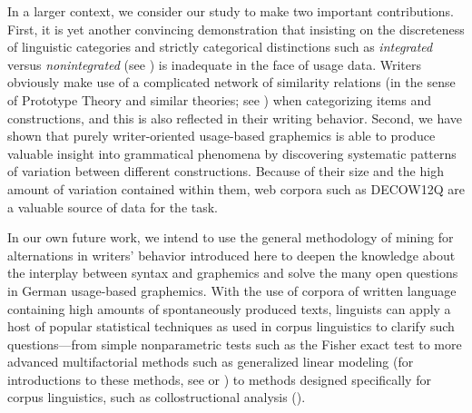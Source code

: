 \begin{styleMoutonText}
In a larger context, we consider our study to make two important contributions. First, it is yet another convincing demonstration that insisting on the discreteness of linguistic categories and strictly categorical distinctions such as \textit{integrated} versus \textit{nonintegrated} (see ) is inadequate in the face of usage data. Writers obviously make use of a complicated network of similarity relations (in the sense of Prototype Theory and similar theories; see ) when categorizing items and constructions, and this is also reflected in their writing behavior. Second, we have shown that purely writer-oriented usage-based graphemics is able to produce valuable insight into grammatical phenomena by discovering systematic patterns of variation between different constructions. Because of their size and the high amount of variation contained within them, web corpora such as DECOW12Q are a valuable source of data for the task.
\end{styleMoutonText}

\begin{styleMoutonText}
In our own future work, we intend to use the general methodology of mining for alternations in writers’ behavior introduced here to deepen the knowledge about the interplay between syntax and graphemics and solve the many open questions in German usage-based graphemics. With the use of corpora of written language containing high amounts of spontaneously produced texts, linguists can apply a host of popular statistical techniques as used in corpus linguistics to clarify such questions—from simple nonparametric tests such as the Fisher exact test to more advanced multifactorial methods such as generalized linear modeling (for introductions to these methods, see \citealt{Baayen2008} or \citealt{Gries2013}) to methods designed specifically for corpus linguistics, such as collostructional analysis (\citealt{StefanowitschGries2003}).
\end{styleMoutonText}


